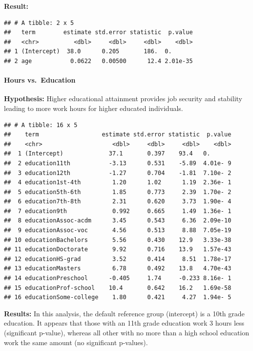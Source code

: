 \documentclass[]{article}
\let\oldparagraph\paragraph
\renewcommand{\paragraph}[1]{\oldparagraph{#1}\mbox{}}
\begin{document}
\textbf{Result:}

\begin{verbatim}
## # A tibble: 2 x 5
##   term        estimate std.error statistic  p.value
##   <chr>          <dbl>     <dbl>     <dbl>    <dbl>
## 1 (Intercept)  38.0      0.205       186.  0.      
## 2 age           0.0622   0.00500      12.4 2.01e-35
\end{verbatim}

\hypertarget{hours-vs.-education}{%
\paragraph{Hours vs.~Education}\label{hours-vs.-education}}

\textbf{Hypothesis:} Higher educational attainment provides job security
and stability leading to more work hours for higher educated
individuals.

\begin{verbatim}
## # A tibble: 16 x 5
##    term                  estimate std.error statistic  p.value
##    <chr>                    <dbl>     <dbl>     <dbl>    <dbl>
##  1 (Intercept)             37.1       0.397    93.4   0.      
##  2 education11th           -3.13      0.531    -5.89  4.01e- 9
##  3 education12th           -1.27      0.704    -1.81  7.10e- 2
##  4 education1st-4th         1.20      1.02      1.19  2.36e- 1
##  5 education5th-6th         1.85      0.773     2.39  1.70e- 2
##  6 education7th-8th         2.31      0.620     3.73  1.90e- 4
##  7 education9th             0.992     0.665     1.49  1.36e- 1
##  8 educationAssoc-acdm      3.45      0.543     6.36  2.09e-10
##  9 educationAssoc-voc       4.56      0.513     8.88  7.05e-19
## 10 educationBachelors       5.56      0.430    12.9   3.33e-38
## 11 educationDoctorate       9.92      0.716    13.9   1.57e-43
## 12 educationHS-grad         3.52      0.414     8.51  1.78e-17
## 13 educationMasters         6.78      0.492    13.8   4.70e-43
## 14 educationPreschool      -0.405     1.74     -0.233 8.16e- 1
## 15 educationProf-school    10.4       0.642    16.2   1.69e-58
## 16 educationSome-college    1.80      0.421     4.27  1.94e- 5
\end{verbatim}

\textbf{Results:} In this analysis, the default reference group
(intercept) is a 10th grade education. It appears that those with an
11th grade education work 3 hours less (significant p-value), whereas
all other with no more than a high school education work the same amount
(no significant p-values).
\end{document}
